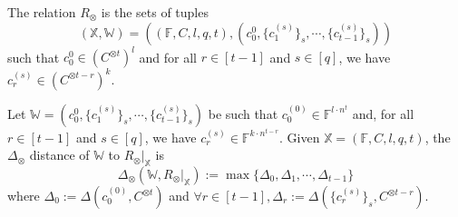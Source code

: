 \begin{definition}
The relation $R_\otimes$ is the sets of tuples
$$
    (\mathbb{X}, \mathbb{W}) = ((\mathbb{F}, C, l, q, t), (c_0^{0}, \{c_1^{(s)}\}_s, \cdots, \{c_{t-1}^{(s)}\}_s))
$$ 
such that $c_0^{0} \in (C^{\otimes t})^l$ and for all $r \in [t-1]$ and $s \in [q]$, we have $c_r^{(s)} \in (C^{\otimes t-r})^k$.
\end{definition}

\begin{definition}
Let $\mathbb{W} = (c_0^{0}, \{c_1^{(s)}\}_s, \cdots, \{c_{t-1}^{(s)}\}_s)$ be such that $c_0^{(0)} \in \mathbb{F}^{l \cdot n^t}$ and, for all $r \in [t-1]$ and $s \in [q]$, we have $c_r^{(s)} \in \mathbb{F}^{k \cdot n^{t-r}}$. Given $\mathbb{X} = (\mathbb{F}, C, l, q, t)$, the $\Delta_\otimes$ distance of $\mathbb{W}$ to $R_\otimes|_{\mathbb{X}}$ is
$$
    \Delta_\otimes(\mathbb{W}, R_\otimes|_{\mathbb{X}}) := \max \{\Delta_0, \Delta_1, \cdots, \Delta_{t-1}\}
$$
where $\Delta_0 := \Delta(c_0^{(0)}, C^{\otimes t})$ and $\forall r \in [t-1], \Delta_r := \Delta(\{c_r^{(s)}\}_s, C^{\otimes t-r})$.
\end{definition}